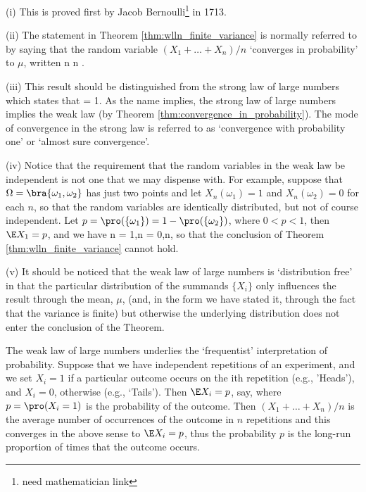 \begin{remark}\label{rem:wlln}
\ben
\item [(i)] This is proved first by Jacob Bernoulli\footnote{need mathematician link} in 1713.
\item [(ii)] The statement in Theorem \ref{thm:wlln_finite_variance} is normally referred to by saying that the random variable $(X_1 + \dots+ X_n)/n$ `converges in probability' to $\mu$, written
\be
{}n  \mu {}n \to \infty.
\ee
\item [(iii)] This result should be distinguished from the strong law of large numbers which states that
\be
\pro {} = 1.
\ee
As the name implies, the strong law of large numbers implies the weak law (by Theorem \ref{thm:convergence_in_probability}). The mode of convergence in the strong law is referred to as `convergence with probability one' or `almost sure convergence'.

\item [(iv)] Notice that the requirement that the random variables in the weak law be independent is not one that we may dispense with. For example, suppose that $\Omega = \bra{\omega_1, \omega_2}$ has just two points and let $X_n(\omega_1) = 1$ and $X_n(\omega_2) = 0$ for each $n$, so that the random variables are identically distributed, but not of course independent. Let $p = \pro(\{\omega_1\}) = 1 -\pro(\{\omega_2\})$, where $0 < p < 1$, then $\E X_1 = p$, and we have
\be
{}n = 1,\quad\quad {}n = 0,\quad  {}n,
\ee
so that the conclusion of Theorem \ref{thm:wlln_finite_variance} cannot hold.

\item [(v)] It should be noticed that the weak law of large numbers is `distribution free' in that the particular distribution of the summands $\{X_i\}$ only influences the result through the mean, $\mu$, (and, in the form we have stated it, through the fact that the variance is finite) but otherwise the underlying distribution does not enter the conclusion of the Theorem.
\een
\end{remark}

\begin{example}
The weak law of large numbers underlies the `frequentist' interpretation of probability. Suppose that we have independent repetitions of an experiment, and we set $X_i = 1$ if a particular outcome occurs on the ith repetition (e.g., 'Heads'), and $X_i = 0$, otherwise (e.g., `Tails'). Then $\E X_i = p$, say, where $p = \pro(X_i = 1)$ is the probability of the outcome. Then $(X_1 +\dots+X_n)/n$ is the average number of occurrences of the outcome in $n$ repetitions and this converges in the above sense to $\E X_i = p$, thus the probability $p$ is  the long-run proportion of times that the outcome occurs.
\end{example}


